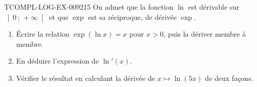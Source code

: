\begin{exercice}{TCOMPL-LOG-EX-009}{2}{15}
On admet que la fonction $\ln$ est dérivable sur $\left]0\,;\,+\infty\right[$
et que $\exp$ est sa réciproque, de dérivée $\exp$.
\begin{enumerate}
  \item Écrire la relation $\exp(\ln x)=x$ pour $x>0$, puis la dériver membre
        à membre.
  \item En déduire l'expression de $\ln'(x)$.
  \item Vérifier le résultat en calculant la dérivée de $x\mapsto\ln(5x)$ de
        deux façons.
\end{enumerate}
\end{exercice}
